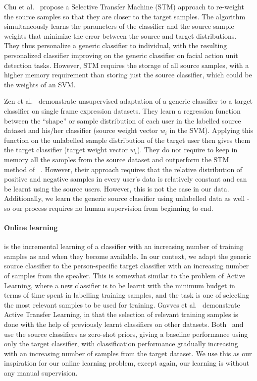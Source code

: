 \documentclass[runningheads]{llncs}
\begin{document}
Chu et al.~\cite{Chu13} propose a Selective Transfer Machine (STM) approach to re-weight the source samples so that they are closer to the target samples. The algorithm simultaneously learns the parameters of the classifier and the source sample weights that minimize the error between the source and target distributions. They thus personalize a generic classifier to individual, with the resulting personalized classifier improving on the generic classifier on facial action unit detection tasks.
%
However, STM requires the storage of all source samples, with a higher memory requirement than storing just the source classifier, which could be the weights of an SVM.

Zen et al.~\cite{Zen14} demonstrate unsupervised adaptation of a generic classifier to a target classifier on single frame expression datasets. They learn a regression function between the ``shape'' or sample distribution of each user in the labelled source dataset and his/her classifier (source weight vector $w_i$ in the SVM). 
Applying this function on the unlabelled sample distribution of the target user then gives them the target classifier (target weight vector $w_t$). They do not require to keep in memory all the samples from the source dataset and outperform the STM method of ~\cite{Chu13}. However, their approach requires that the relative distribution of positive and negative samples in every user's data is relatively constant 
and can be learnt using the source users. However, this is not the case in our data. Additionally, we learn the generic source classifier using unlabelled data as well - so our process requires no human supervision from beginning to end.

\paragraph{Online learning} 
is the incremental learning of a classifier with an increasing number of training samples as and when they become available. In our context, we adapt the generic source classifier to the person-specific target classifier with an increasing number of samples from the speaker. This is somewhat similar to the problem of Active Learning, where a new classifier is to be learnt with the minimum budget in terms of time spent in labelling training samples, and the task is one of selecting the most relevant samples to be used for training. Gavves et al.~\cite{Gavves15} demonstrate Active Transfer Learning, in that the selection of relevant training samples is done with the help of previously learnt classifiers on other datasets. Both~\cite{Gavves15} and~\cite{Zen14} use the source classifiers as zero-shot priors, giving a baseline performance using only the target classifier, with classification performance gradually increasing with an increasing number of samples from the target dataset. We use this as our inspiration for our online learning problem, except again, our learning is without any manual supervision.
\end{document}
